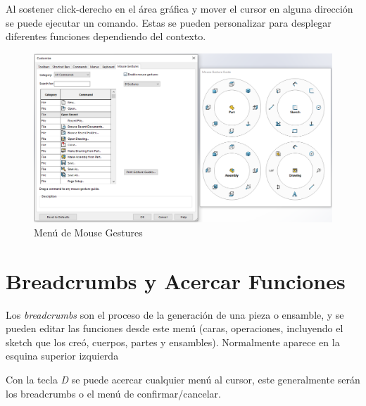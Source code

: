 \documentclass[12pt,letterpaper,final]{report}
\begin{document}
Al sostener click-derecho en el área gráfica y mover el cursor en alguna dirección se puede ejecutar un comando. Estas se pueden personalizar para desplegar diferentes funciones dependiendo del contexto.

\begin{figure}[H]
	\centering
	\includegraphics[width=0.95\linewidth, height=0.75\textheight,keepaspectratio]{Imagenes/solidworks_mousegestures_01}
	\caption{Menú de Mouse Gestures}
	\label{fig:solidworksmousegestures01}
\end{figure}


\chapter{Breadcrumbs y Acercar Funciones}

Los \emph{breadcrumbs} son el proceso de la generación de una pieza o ensamble, y se pueden editar las funciones desde este menú (caras, operaciones, incluyendo el sketch que los creó, cuerpos, partes y ensambles). Normalmente aparece en la esquina superior izquierda

Con la tecla \emph{D} se puede acercar cualquier menú al cursor, este generalmente serán los breadcrumbs o el menú de confirmar/cancelar.
\end{document}

